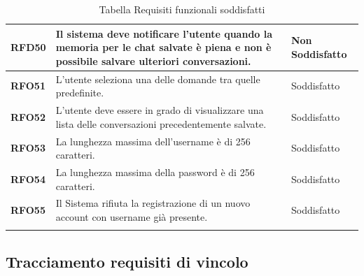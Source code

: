 \begin{longtable}{|>{\centering\arraybackslash}m{}|>{\centering\arraybackslash}m{}|>{\centering\arraybackslash}m{}|}
    \hline
    \textbf{RFD50} & Il sistema deve notificare l'utente quando la memoria per le chat salvate è piena e non è possibile salvare ulteriori conversazioni. & Non Soddisfatto \\
    \hline
    \textbf{RFO51} & L'utente seleziona una delle domande tra quelle predefinite. & Soddisfatto \\
    \hline
    \textbf{RFO52} & L'utente deve essere in grado di visualizzare una lista delle conversazioni precedentemente salvate. & Soddisfatto \\
    \hline
    \textbf{RFO53} & La lunghezza massima dell'username è di 256 caratteri. & Soddisfatto \\
    \hline
    \textbf{RFO54} & La lunghezza massima della password è di 256 caratteri. & Soddisfatto \\
    \hline
    \textbf{RFO55} & Il Sistema rifiuta la registrazione di un nuovo account con username già presente. & Soddisfatto \\
    \hline

\caption{Tabella Requisiti funzionali soddisfatti}
\end{longtable}

\subsection{Tracciamento requisiti di vincolo}

